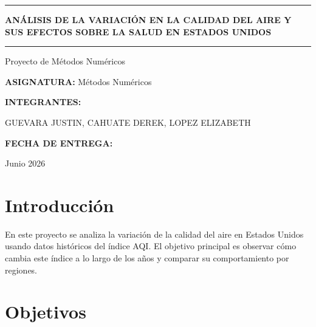 \documentclass[12pt]{report}
\begin{document}

\thispagestyle{empty}

\vspace*{2cm}

\begin{center}

\noindent\rule{\textwidth}{0.4pt}

\vspace{0.5cm}

{\Huge\bfseries ANÁLISIS DE LA VARIACIÓN EN LA CALIDAD DEL AIRE Y SUS EFECTOS SOBRE LA SALUD EN ESTADOS UNIDOS}

\vspace{0.5cm}

\noindent\rule{\textwidth}{0.4pt}

\vspace{0.5cm}

{\large Proyecto de Métodos Numéricos}

\vspace{2cm}

\textbf{ASIGNATURA:} Métodos Numéricos

\vspace{0.5cm}

\textbf{INTEGRANTES:}

GUEVARA JUSTIN, CAHUATE DEREK, LOPEZ ELIZABETH

\vspace{2cm}

\textbf{FECHA DE ENTREGA:}

Junio 2026

\end{center}

\newpage


\tableofcontents
\thispagestyle{empty}

\newpage


\setcounter{page}{1}

\section{Introducción}

En este proyecto se analiza la variación de la calidad del aire en Estados Unidos usando datos históricos del índice AQI. El objetivo principal es observar cómo cambia este índice a lo largo de los años y comparar su comportamiento por regiones.

\section{Objetivos}
\end{document}
